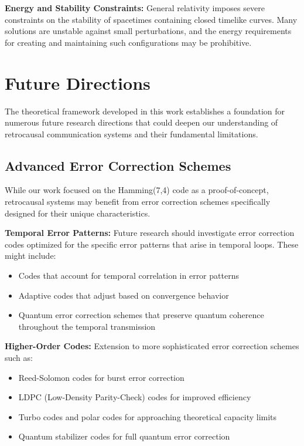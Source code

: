 \documentclass[12pt,a4paper]{article}
\begin{document}
\textbf{Energy and Stability Constraints:} General relativity imposes severe constraints on the stability of spacetimes containing closed timelike curves. Many solutions are unstable against small perturbations, and the energy requirements for creating and maintaining such configurations may be prohibitive.

\section{Future Directions}

The theoretical framework developed in this work establishes a foundation for numerous future research directions that could deepen our understanding of retrocausal communication systems and their fundamental limitations.

\subsection{Advanced Error Correction Schemes}

While our work focused on the Hamming(7,4) code as a proof-of-concept, retrocausal systems may benefit from error correction schemes specifically designed for their unique characteristics.

\textbf{Temporal Error Patterns:} Future research should investigate error correction codes optimized for the specific error patterns that arise in temporal loops. These might include:
\begin{itemize}
\item Codes that account for temporal correlation in error patterns
\item Adaptive codes that adjust based on convergence behavior
\item Quantum error correction schemes that preserve quantum coherence throughout the temporal transmission
\end{itemize}

\textbf{Higher-Order Codes:} Extension to more sophisticated error correction schemes such as:
\begin{itemize}
\item Reed-Solomon codes for burst error correction
\item LDPC (Low-Density Parity-Check) codes for improved efficiency
\item Turbo codes and polar codes for approaching theoretical capacity limits
\item Quantum stabilizer codes for full quantum error correction
\end{itemize}
\end{document}
